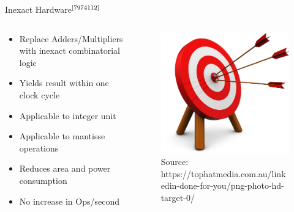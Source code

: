 \documentclass{beamer}
\begin{document}
\begin{frame}{Inexact Hardware$^{\text{\cite{7974112}}}$}
\begin {columns}
 \begin{column}{0.7\textwidth}
 
    \begin{itemize}
        \item<1->Replace Adders/Multipliers with inexact combinatorial logic
        \item<2->Yields result within one clock cycle
        \item<3->Applicable to integer unit 
        \item<4->Applicable to mantisse operations
        \item<5->Reduces area and power consumption
        \item<6->No increase in Ops/second
    \end{itemize}
    
 \end{column}
  \begin{column}{0.3\textwidth}
    \begin{figure}
     \includegraphics[width=\textwidth]{img/target.png}
     \caption{Source: https://tophatmedia.com.au/linkedin-done-for-you/png-photo-hd-target-0/}
    \end{figure}
  \end{column}
\end {columns}
\end{frame}
\end{document}
